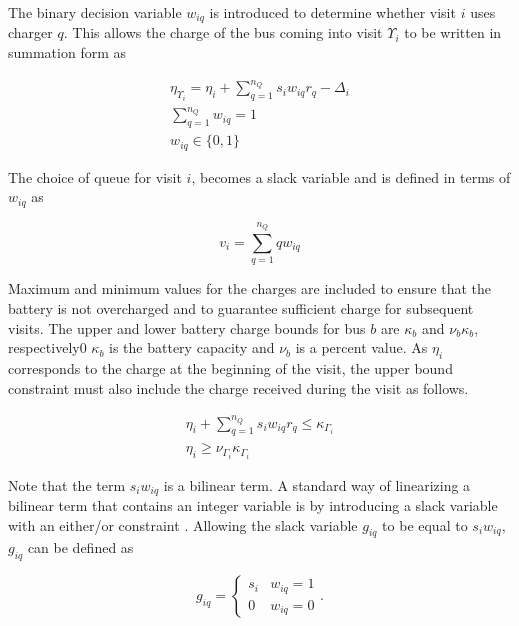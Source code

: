\documentclass[utf8]{FrontiersinHarvard}
\let\cite\citep                                       %
\begin{document}
The binary decision variable \(w_{iq}\) is introduced to determine whether visit \(i\) uses charger \(q\). This allows the
charge of the bus coming into visit \(\Upsilon_i\) to be written in summation form as

\begin{subequations}
    \label{subeq:pre_next_charge}
\begin{align}
    \eta_{\Upsilon_i} = \eta_i + \sum_{q=1}^{n_Q} s_i w_{iq} r_q - \Delta_i  \\
    \sum_{q=1}^{n_Q} w_{iq} = 1 \\
    w_{iq} \in \{0,1\}
\end{align}
\end{subequations}

The choice of queue for visit \(i\), becomes a slack variable and is defined in terms of \(w_{iq}\) as

\begin{equation}
    v_i = \sum_{q=1}^{n_Q} qw_{iq}
\end{equation}

Maximum and minimum values for the charges are included to ensure that the battery is not overcharged and to guarantee
sufficient charge for subsequent visits. The upper and lower battery charge bounds for bus \(b\) are \(\kappa_b\) and \(\nu_b \kappa_b\),
respectively0 \(\kappa_b\) is the battery capacity and \(\nu_b\) is a percent value. As \(\eta_i\) corresponds to the charge at the
beginning of the visit, the upper bound constraint must also include the charge received during the visit as follows.

\begin{subequations}
    \label{subeq:pre_min_max}
\begin{align}
    \eta_i + \sum_{q=1}^{n_Q} s_i w_{iq} r_q \leq \kappa_{\Gamma_i}                 \\
    \eta_i \geq \nu_{\Gamma_i} \kappa_{\Gamma_i}
\end{align}
\end{subequations}

Note that the term \(s_i w_{iq}\) is a bilinear term. A standard way of linearizing a bilinear term that contains an
integer variable is by introducing a slack variable with an either/or constraint
\cite{chen-2010-applied,rodriguez-2013-compar-asses}. Allowing the slack variable \(g_{iq}\) to be equal to \(s_i w_{iq}\),
\(g_{iq}\) can be defined as

\begin{equation}
    \label{eq:giq_cases}
    g_{iq} =
    \begin{cases}
        s_i & w_{iq} = 1 \\
        0 & w_{iq} = 0
    \end{cases}.
\end{equation}
\end{document}
